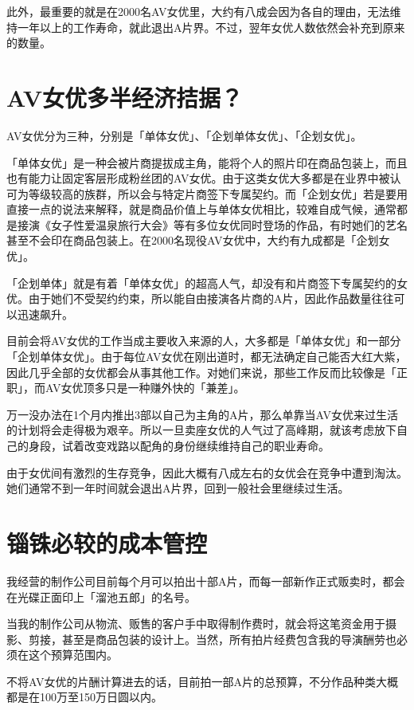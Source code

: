\documentclass[12pt,UTF8]{ctexbook}
\begin{document}
此外，最重要的就是在2000名AV女优里，大约有八成会因为各自的理由，无法维持一年以上的工作寿命，就此退出A片界。不过，翌年女优人数依然会补充到原来的数量。

\section{AV女优多半经济拮据？}

AV女优分为三种，分别是「单体女优」、「企划单体女优」、「企划女优」。

「单体女优」是一种会被片商提拔成主角，能将个人的照片印在商品包装上，而且也有能力让固定客层形成粉丝团的AV女优。由于这类女优大多都是在业界中被认可为等级较高的族群，所以会与特定片商签下专属契约。而「企划女优」若是要用直接一点的说法来解释，就是商品价值上与单体女优相比，较难自成气候，通常都是接演《女子性爱温泉旅行大会》等有多位女优同时登场的作品，有时她们的艺名甚至不会印在商品包装上。在2000名现役AV女优中，大约有九成都是「企划女优」。

「企划单体」就是有着「单体女优」的超高人气，却没有和片商签下专属契约的女优。由于她们不受契约约束，所以能自由接演各片商的A片，因此作品数量往往可以迅速飙升。

目前会将AV女优的工作当成主要收入来源的人，大多都是「单体女优」和一部分「企划单体女优」。由于每位AV女优在刚出道时，都无法确定自己能否大红大紫，因此几乎全部的女优都会从事其他工作。对她们来说，那些工作反而比较像是「正职」，而AV女优顶多只是一种赚外快的「兼差」。

万一没办法在1个月内推出3部以自己为主角的A片，那么单靠当AV女优来过生活的计划将会走得极为艰辛。所以一旦卖座女优的人气过了高峰期，就该考虑放下自己的身段，试着改变戏路以配角的身份继续维持自己的职业寿命。

由于女优间有激烈的生存竞争，因此大概有八成左右的女优会在竞争中遭到淘汰。她们通常不到一年时间就会退出A片界，回到一般社会里继续过生活。

\section{锱铢必较的成本管控}

我经营的制作公司目前每个月可以拍出十部A片，而每一部新作正式贩卖时，都会在光碟正面印上「溜池五郎」的名号。

当我的制作公司从物流、贩售的客户手中取得制作费时，就会将这笔资金用于摄影、剪接，甚至是商品包装的设计上。当然，所有拍片经费包含我的导演酬劳也必须在这个预算范围内。

不将AV女优的片酬计算进去的话，目前拍一部A片的总预算，不分作品种类大概都是在100万至150万日圆以内。
\end{document}
